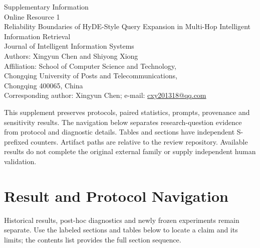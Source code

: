 \documentclass[pdflatex,sn-basic,Numbered]{sn-jnl}
\begin{document}
\begin{center}
{\Large Supplementary Information}\\[3pt]
{\large Online Resource 1}\\[6pt]
{\large Reliability Boundaries of HyDE-Style Query Expansion in Multi-Hop Intelligent Information Retrieval}\\[6pt]
{\normalsize Journal of Intelligent Information Systems}\\[3pt]
{\normalsize Authors: Xingyun Chen and Shiyong Xiong}\\[2pt]
{\normalsize Affiliation: School of Computer Science and Technology,}\\
{\normalsize Chongqing University of Posts and Telecommunications,}\\
{\normalsize Chongqing 400065, China}\\[2pt]
{\normalsize Corresponding author: Xingyun Chen; e-mail: \href{mailto:cxy201318@qq.com}{cxy201318@qq.com}}
\end{center}

\noindent
This supplement preserves protocols, paired statistics, prompts, provenance and sensitivity results. The navigation below separates research-question evidence from protocol and diagnostic details. Tables and sections have independent S-prefixed counters. Artifact paths are relative to the review repository. Available results do not complete the original external family or supply independent human validation.

\section*{Result and Protocol Navigation}
\noindent Historical results, post-hoc diagnostics and newly frozen experiments remain separate. Use the labeled sections and tables below to locate a claim and its limits; the contents list provides the full section sequence.
\end{document}
